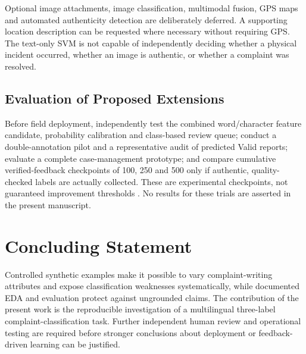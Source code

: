Optional image attachments, image classification, multimodal fusion, GPS maps and automated authenticity detection are deliberately deferred. A supporting location description can be requested where necessary without requiring GPS. The text-only SVM is not capable of independently deciding whether a physical incident occurred, whether an image is authentic, or whether a complaint was resolved.

\subsection{Evaluation of Proposed Extensions}
Before field deployment, independently test the combined word/character feature candidate, probability calibration and class-based review queue; conduct a double-annotation pilot and a representative audit of predicted Valid reports; evaluate a complete case-management prototype; and compare cumulative verified-feedback checkpoints of 100, 250 and 500 only if authentic, quality-checked labels are actually collected. These are experimental checkpoints, not guaranteed improvement thresholds \cite{figueroa2012,ghose2024,fleisig2024}. No results for these trials are asserted in the present manuscript.

\section{Concluding Statement}
Controlled synthetic examples make it possible to vary complaint-writing attributes and expose classification weaknesses systematically, while documented EDA and evaluation protect against ungrounded claims. The contribution of the present work is the reproducible investigation of a multilingual three-label complaint-classification task. Further independent human review and operational testing are required before stronger conclusions about deployment or feedback-driven learning can be justified.
